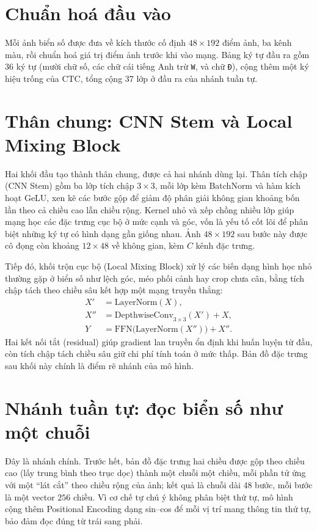 \documentclass[12pt,a4paper]{report}
\begin{document}
\section{Chuẩn hoá đầu vào}
Mỗi ảnh biển số được đưa về kích thước cố định $48\times192$ điểm ảnh, ba kênh màu, rồi chuẩn hoá giá trị điểm ảnh trước khi vào mạng. Bảng ký tự đầu ra gồm 36 ký tự (mười chữ số, các chữ cái tiếng Anh trừ \texttt{W}, và chữ \texttt{Đ}), cộng thêm một ký hiệu trống của CTC, tổng cộng 37 lớp ở đầu ra của nhánh tuần tự.

\section{Thân chung: CNN Stem và Local Mixing Block}
Hai khối đầu tạo thành thân chung, được cả hai nhánh dùng lại. Thân tích chập (CNN Stem) gồm ba lớp tích chập $3\times3$, mỗi lớp kèm BatchNorm và hàm kích hoạt GeLU, xen kẽ các bước gộp để giảm độ phân giải không gian khoảng bốn lần theo cả chiều cao lẫn chiều rộng. Kernel nhỏ và xếp chồng nhiều lớp giúp mạng học các đặc trưng cục bộ ở mức cạnh và góc, vốn là yếu tố cốt lõi để phân biệt những ký tự có hình dạng gần giống nhau. Ảnh $48\times192$ sau bước này được cô đọng còn khoảng $12\times48$ về không gian, kèm $C$ kênh đặc trưng.

Tiếp đó, khối trộn cục bộ (Local Mixing Block) xử lý các biến dạng hình học nhỏ thường gặp ở biển số như lệch góc, méo phối cảnh hay crop chưa cân, bằng tích chập tách theo chiều sâu kết hợp một mạng truyền thẳng:
\begin{align}
X' &= \text{LayerNorm}(X), \\
X'' &= \text{DepthwiseConv}_{3\times3}(X') + X, \\
Y &= \text{FFN}\big(\text{LayerNorm}(X'')\big) + X''.
\end{align}
Hai kết nối tắt (residual) giúp gradient lan truyền ổn định khi huấn luyện từ đầu, còn tích chập tách chiều sâu giữ chi phí tính toán ở mức thấp. Bản đồ đặc trưng sau khối này chính là điểm rẽ nhánh của mô hình.

\section{Nhánh tuần tự: đọc biển số như một chuỗi}
Đây là nhánh chính. Trước hết, bản đồ đặc trưng hai chiều được gộp theo chiều cao (lấy trung bình theo trục dọc) thành một chuỗi một chiều, mỗi phần tử ứng với một ``lát cắt'' theo chiều rộng của ảnh; kết quả là chuỗi dài 48 bước, mỗi bước là một vector $256$ chiều. Vì cơ chế tự chú ý không phân biệt thứ tự, mô hình cộng thêm Positional Encoding dạng sin--cos để mỗi vị trí mang thông tin thứ tự, bảo đảm đọc đúng từ trái sang phải.
\end{document}
